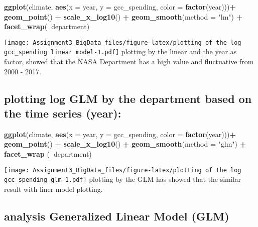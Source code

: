 \documentclass[]{article}
\newenvironment{Shaded}{\begin{snugshade}}{\end{snugshade}}
\newcommand{\KeywordTok}[1]{\textcolor[rgb]{0.13,0.29,0.53}{\textbf{#1}}}
\newcommand{\DataTypeTok}[1]{\textcolor[rgb]{0.13,0.29,0.53}{#1}}
\newcommand{\StringTok}[1]{\textcolor[rgb]{0.31,0.60,0.02}{#1}}
\newcommand{\OperatorTok}[1]{\textcolor[rgb]{0.81,0.36,0.00}{\textbf{#1}}}
\newcommand{\NormalTok}[1]{#1}
\begin{document}
\begin{Shaded}
\begin{Highlighting}[]
\KeywordTok{ggplot}\NormalTok{(climate, }\KeywordTok{aes}\NormalTok{(}\DataTypeTok{x =}\NormalTok{ year, }\DataTypeTok{y =}\NormalTok{ gcc_spending, }\DataTypeTok{color =} \KeywordTok{factor}\NormalTok{(year)))}\OperatorTok{+}
\StringTok{  }\KeywordTok{geom_point}\NormalTok{() }\OperatorTok{+}\StringTok{ }\KeywordTok{scale_x_log10}\NormalTok{() }\OperatorTok{+}\StringTok{ }\KeywordTok{geom_smooth}\NormalTok{(}\DataTypeTok{method =} \StringTok{"lm"}\NormalTok{) }\OperatorTok{+}\StringTok{ }\KeywordTok{facet_wrap}\NormalTok{(}\OperatorTok{~}\NormalTok{department)}
\end{Highlighting}
\end{Shaded}

\texttt{[image: Assignment3\_BigData\_files/figure-latex/plotting of the log gcc\_spending linear model-1.pdf]}
plotting by the linear and the year as factor, showed that the NASA
Department has a high value and fluctuative from 2000 - 2017.

\subsection{plotting log GLM by the department based on the time series
(year):}\label{plotting-log-glm-by-the-department-based-on-the-time-series-year}

\begin{Shaded}
\begin{Highlighting}[]
\KeywordTok{ggplot}\NormalTok{(climate, }\KeywordTok{aes}\NormalTok{(}\DataTypeTok{x =}\NormalTok{ year, }\DataTypeTok{y =}\NormalTok{ gcc_spending, }\DataTypeTok{color =} \KeywordTok{factor}\NormalTok{(year)))}\OperatorTok{+}
\StringTok{  }\KeywordTok{geom_point}\NormalTok{() }\OperatorTok{+}\StringTok{ }\KeywordTok{scale_x_log10}\NormalTok{() }\OperatorTok{+}\StringTok{ }\KeywordTok{geom_smooth}\NormalTok{(}\DataTypeTok{method =} \StringTok{"glm"}\NormalTok{) }\OperatorTok{+}\StringTok{ }\KeywordTok{facet_wrap}\NormalTok{ (}\OperatorTok{~}\NormalTok{department)}
\end{Highlighting}
\end{Shaded}

\texttt{[image: Assignment3\_BigData\_files/figure-latex/plotting of the log gcc\_spending glm-1.pdf]}
plotting by the GLM has showed that the similar result with liner model
plotting.

\subsection{analysis Generalized Linear Model
(GLM)}\label{analysis-generalized-linear-model-glm}
\end{document}
